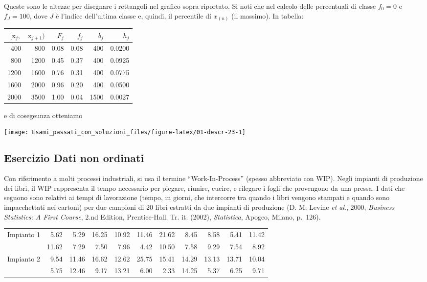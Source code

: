 \documentclass[
  11pt,
]{book}
\theoremstyle{mytheoremstyle}
\theoremstyle{mydefstyle}
\newenvironment{sol}
  {
  \begin{tcolorbox}[enhanced,breakable,arc=0.1mm,boxrule=1pt,colback=white,colframe=iblue,
  title=\bf \fontfamily{lmss}\selectfont \hspace{.5 cm} Soluzione,drop fuzzy shadow]

}{
\end{tcolorbox}
  }
\begin{document}
\begin{sol}
Queste sono le altezze per disegnare i rettangoli nel grafico
sopra riportato.
Si noti che nel calcolo delle percentuali di classe \(f_{0}=0\)
e \(f_{J}=100\), dove \(J\) è l'indice dell'ultima classe e,
quindi, il percentile di \(x_{(n)}\) (il massimo).
In tabella:

\begin{table}[H]
\centering
\begin{tabular}{rrrrrr}
\toprule
$[\text{x}_j,$ & $\text{x}_{j+1})$ & $F_j$ & $f_j$ & $b_j$ & $h_j$\\
\midrule
400 & 800 & 0.08 & 0.08 & 400 & 0.0200\\
800 & 1200 & 0.45 & 0.37 & 400 & 0.0925\\
1200 & 1600 & 0.76 & 0.31 & 400 & 0.0775\\
1600 & 2000 & 0.96 & 0.20 & 400 & 0.0500\\
2000 & 3500 & 1.00 & 0.04 & 1500 & 0.0027\\
\bottomrule
\end{tabular}
\end{table}

e di cosegeunza otteniamo

\begin{center}\texttt{[image: Esami\_passati\_con\_soluzioni\_files/figure-latex/01-descr-23-1]} \end{center}

\end{sol}

\subsection{Esercizio Dati non ordinati}\label{esercizio-dati-non-ordinati}

Con riferimento a molti processi industriali, si usa il
termine ``Work-In-Process'' (spesso abbreviato con WIP).
Negli impianti di produzione dei libri, il WIP rappresenta
il tempo necessario per piegare, riunire, cucire, e rilegare
i fogli che provengono da una pressa.
I dati che seguono sono relativi ai tempi di lavorazione
(tempo, in giorni, che intercorre tra quando i libri vengono
stampati e quando sono impacchettati nei cartoni) per due
campioni di 20 libri estratti da due impianti di produzione
(D. M. Levine \emph{et al}., 2000, \emph{Business Statistics:
A First Course}, 2.nd Edition, Prentice-Hall. Tr. it. (2002),
\emph{Statistica}, Apogeo, Milano, p.~126).

\begin{tabular}{lrrrrrrrrrr}
\toprule
Impianto 1 & 5.62 & 5.29 & 16.25 & 10.92 & 11.46 & 21.62 & 8.45 & 8.58 & 5.41 & 11.42\\
 & 11.62 & 7.29 & 7.50 & 7.96 & 4.42 & 10.50 & 7.58 & 9.29 & 7.54 & 8.92\\
Impianto 2 & 9.54 & 11.46 & 16.62 & 12.62 & 25.75 & 15.41 & 14.29 & 13.13 & 13.71 & 10.04\\
 & 5.75 & 12.46 & 9.17 & 13.21 & 6.00 & 2.33 & 14.25 & 5.37 & 6.25 & 9.71\\
\bottomrule
\end{tabular}
\end{document}

